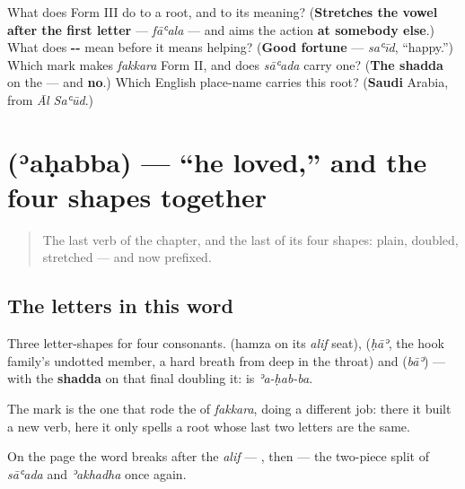 \begin{tcolorbox}[breakable,colback=teal!4,colframe=teal!35!black,title={Before you move on}]
What does Form III do to a root, and to its meaning? (\textbf{Stretches the vowel after the first letter} — \emph{fāʿala} — and aims the action \textbf{at somebody else}.) What does \textbf{--} mean before it means helping? (\textbf{Good fortune} — \emph{saʿīd}, \textquotedblleft{}happy.\textquotedblright{}) Which mark makes \emph{fakkara} Form II, and does \emph{sāʿada} carry one? (\textbf{The shadda} on the \textbf{} — and \textbf{no}.) Which English place-name carries this root? (\textbf{Saudi} Arabia, from \emph{Āl Saʿūd}.)
\end{tcolorbox}
\section[\texorpdfstring{\ar{أحبّ} (ʾaḥabba)}{أحبّ (ʾaḥabba)}]{ (ʾaḥabba) — \textquotedblleft{}he loved,\textquotedblright{} and the four shapes together}

\label{lesson:AR-C32-ahabba}



\begin{quote}
The last verb of the chapter, and the last of its four shapes: plain, doubled, stretched — and now prefixed.
\end{quote}

\subsection*{The letters in this word}
Three letter-shapes for four consonants. \textbf{} (hamza on its \emph{alif} seat), \textbf{} (\emph{ḥāʾ}, the hook family's undotted member, a hard breath from deep in the throat) and \textbf{} (\emph{bāʾ}) — with the \textbf{shadda} on that final \textbf{} doubling it: \textbf{} is \emph{ʾa-ḥab-ba}.

The mark is the one that rode the \textbf{} of \emph{fakkara}, doing a different job: there it built a new verb, here it only spells a root whose last two letters are the same.

On the page the word breaks after the \emph{alif} — \textbf{}, then \textbf{} — the two-piece split of \emph{sāʿada} and \emph{ʾakhadha} once again.

